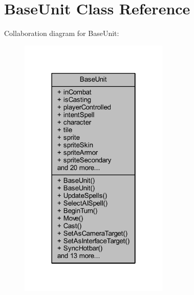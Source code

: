 \hypertarget{class_base_unit}{}\section{Base\+Unit Class Reference}
\label{class_base_unit}


Collaboration diagram for Base\+Unit\+:
\nopagebreak
\begin{figure}[H]
\begin{center}
\leavevmode
\includegraphics[width=202pt]{class_base_unit__coll__graph}
\end{center}
\end{figure}
